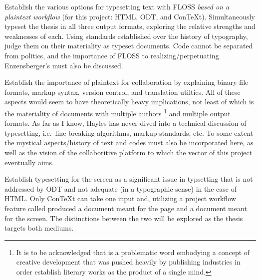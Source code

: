 \startitemize[n][stopper=.]
\item
  Establish the various options for typesetting text with FLOSS
  {\em based on a plaintext workflow} (for this project: HTML, ODT,
  and ConTeXt). Simultaneously typeset the thesis in all three output
  formats, exploring the relative strengths and weaknesses of each.
  Using standards established over the history of typography, judge
  them on their materiality as typeset documents. Code cannot be
  separated from politics, and the importance of FLOSS to
  realizing/perpetuating Enzensberger's 
  must also be discussed.
\item
  Establish the importance of plaintext for collaboration by
  explaining binary file formats, markup syntax, version control, and
  translation utilties. All of these aspects would seem to have
  theoretically heavy implications, not least of which is the
  materiality of documents with multiple authors
  \footnote{It is to be acknowledged that  is a problematic word
embodying a concept of creative development that was pushed heavily
by publishing industries in order establish literary works as the
product of a single mind.}
  and multiple output formats. As far as I know, Hayles has never
  dived into a technical discussion of typesetting,
  i.e.~line-breaking algorithms, markup standards, etc. To some
  extent the mystical aspects/history of text and codes must also be
  incorporated here, as well as the vision of the collaboritive
  platform to which the vector of this project eventually aims.
\item
  Establish typesetting for the screen as a significant issue in
  typsetting that is not addressed by ODT and not adequate (in a
  typographic sense) in the case of HTML. Only ConTeXt can take one
  input and, utilizing a project workflow feature called
   produced a document meant for the page and a
  document meant for the screen. The distinctions between the two
  will be explored as the thesis targets both mediums.
\stopitemize

\stoptext